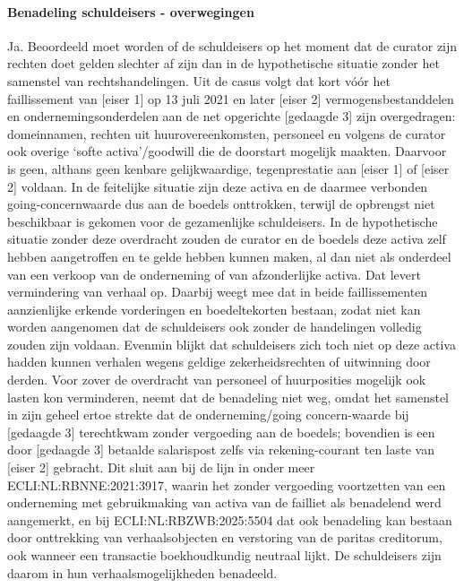 \documentclass[
  dutch,
  a4paper,
]{article}
\begin{document}
\paragraph{Benadeling schuldeisers - overwegingen}\label{benadeling-schuldeisers---overwegingen-22}

Ja. Beoordeeld moet worden of de schuldeisers op het moment dat de curator zijn rechten doet gelden slechter af zijn dan in de hypothetische situatie zonder het samenstel van rechtshandelingen. Uit de casus volgt dat kort vóór het faillissement van {[}eiser 1{]} op 13 juli 2021 en later {[}eiser 2{]} vermogensbestanddelen en ondernemingsonderdelen aan de net opgerichte {[}gedaagde 3{]} zijn overgedragen: domeinnamen, rechten uit huurovereenkomsten, personeel en volgens de curator ook overige `softe activa'/goodwill die de doorstart mogelijk maakten. Daarvoor is geen, althans geen kenbare gelijkwaardige, tegenprestatie aan {[}eiser 1{]} of {[}eiser 2{]} voldaan. In de feitelijke situatie zijn deze activa en de daarmee verbonden going-concernwaarde dus aan de boedels onttrokken, terwijl de opbrengst niet beschikbaar is gekomen voor de gezamenlijke schuldeisers. In de hypothetische situatie zonder deze overdracht zouden de curator en de boedels deze activa zelf hebben aangetroffen en te gelde hebben kunnen maken, al dan niet als onderdeel van een verkoop van de onderneming of van afzonderlijke activa. Dat levert vermindering van verhaal op. Daarbij weegt mee dat in beide faillissementen aanzienlijke erkende vorderingen en boedeltekorten bestaan, zodat niet kan worden aangenomen dat de schuldeisers ook zonder de handelingen volledig zouden zijn voldaan. Evenmin blijkt dat schuldeisers zich toch niet op deze activa hadden kunnen verhalen wegens geldige zekerheidsrechten of uitwinning door derden. Voor zover de overdracht van personeel of huurposities mogelijk ook lasten kon verminderen, neemt dat de benadeling niet weg, omdat het samenstel in zijn geheel ertoe strekte dat de onderneming/going concern-waarde bij {[}gedaagde 3{]} terechtkwam zonder vergoeding aan de boedels; bovendien is een door {[}gedaagde 3{]} betaalde salarispost zelfs via rekening-courant ten laste van {[}eiser 2{]} gebracht. Dit sluit aan bij de lijn in onder meer ECLI:NL:RBNNE:2021:3917, waarin het zonder vergoeding voortzetten van een onderneming met gebruikmaking van activa van de failliet als benadelend werd aangemerkt, en bij ECLI:NL:RBZWB:2025:5504 dat ook benadeling kan bestaan door onttrekking van verhaalsobjecten en verstoring van de paritas creditorum, ook wanneer een transactie boekhoudkundig neutraal lijkt. De schuldeisers zijn daarom in hun verhaalsmogelijkheden benadeeld.
\end{document}
